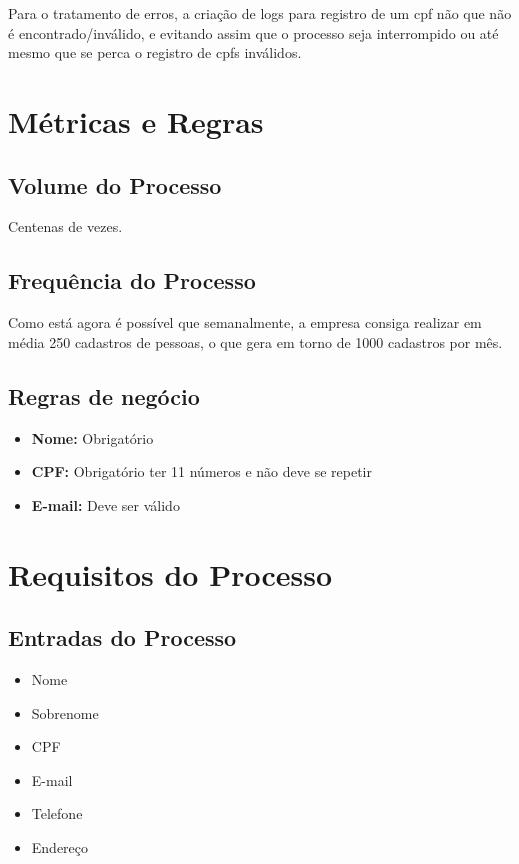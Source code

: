 \documentclass[12pt]{scrreprt}
\begin{document}
Para o tratamento de erros, a criação de logs para registro de um cpf não que não é encontrado/inválido, e evitando assim que o processo seja interrompido ou até mesmo que se perca o registro de cpfs inválidos.

\chapter{Métricas e Regras}

\section{Volume do Processo}
Centenas de vezes.

\section{Frequência do Processo}
Como está agora é possível que semanalmente, a empresa consiga realizar em média 250 cadastros de pessoas, o que gera em torno de 1000 cadastros por mês.

\section{Regras de negócio}
\begin{itemize}
    \item \textbf{Nome:} Obrigatório
    \item \textbf{CPF:} Obrigatório ter 11 números e não deve se repetir
    \item \textbf{E-mail:} Deve ser válido
\end{itemize}

\chapter{Requisitos do Processo}

\section{Entradas do Processo}
\begin{itemize}
    \item Nome
    \item Sobrenome
    \item CPF
    \item E-mail
    \item Telefone
    \item Endereço
\end{itemize}
\end{document}
